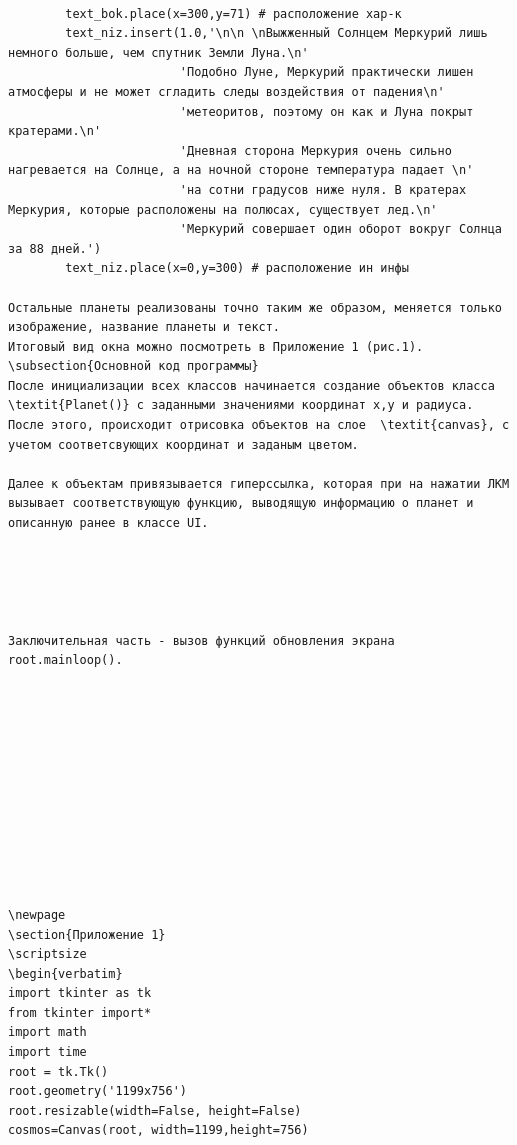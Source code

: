 \documentclass[11pt,a4paper]{report}
\begin{document}
\begin{verbatim}
        
        text_bok.place(x=300,y=71) # расположение хар-к        
        text_niz.insert(1.0,'\n\n \nВыжженный Солнцем Меркурий лишь немного больше, чем спутник Земли Луна.\n'
                        'Подобно Луне, Меркурий практически лишен атмосферы и не может сгладить следы воздействия от падения\n' 
                        'метеоритов, поэтому он как и Луна покрыт кратерами.\n'
                        'Дневная сторона Меркурия очень сильно нагревается на Солнце, а на ночной стороне температура падает \n'
                        'на сотни градусов ниже нуля. В кратерах Меркурия, которые расположены на полюсах, существует лед.\n'
                        'Меркурий совершает один оборот вокруг Солнца за 88 дней.')
        text_niz.place(x=0,y=300) # расположение ин инфы

Остальные планеты реализованы точно таким же образом, меняется только изображение, название планеты и текст.
Итоговый вид окна можно посмотреть в Приложение 1 (рис.1).
\subsection{Основной код программы}
После инициализации всех классов начинается создание объектов класса \textit{Planet()} с заданными значениями координат x,y и радиуса.
После этого, происходит отрисовка объектов на слое  \textit{canvas}, с  учетом соответсвующих координат и заданым цветом. 

Далее к объектам привязывается гиперссылка, которая при на нажатии ЛКМ вызывает соответствующую функцию, выводящую информацию о планет и  описанную ранее в классе UI.  





Заключительная часть - вызов функций обновления экрана root.mainloop().












\newpage
\section{Приложение 1}
\scriptsize
\begin{verbatim}
import tkinter as tk
from tkinter import*
import math
import time
root = tk.Tk()
root.geometry('1199x756')
root.resizable(width=False, height=False)
cosmos=Canvas(root, width=1199,height=756)


\end{verbatim}
\end{document}
